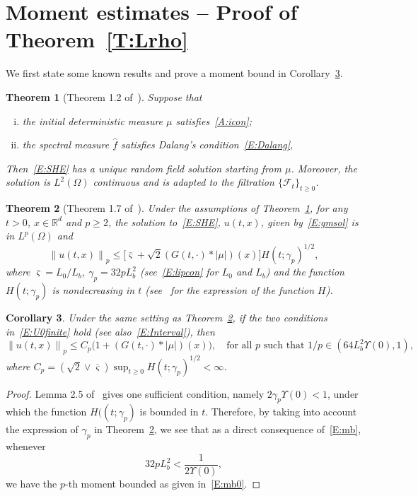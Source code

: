 \documentclass[a4paper,11pt]{article}%
\theoremstyle{plain}
\newtheorem{theorem}{Theorem}[section]
\newtheorem{corollary}[theorem]{Corollary}
\theoremstyle{definition}
\numberwithin{equation}{section}
\newcommand{\R}{\mathbb{R}}
\newcommand{\Norm}[1]{\left\| #1 \right\|}
\begin{document}
\section{Moment estimates -- Proof of Theorem~\ref{T:Lrho}}\label{S:Lrho}
We first state some known results and prove a moment bound in Corollary~\ref{C:Mom}.

\begin{theorem}[Theorem 1.2 of~\cite{chen.huang:19:comparison}]\label{T:Solve}
  Suppose that
  \begin{enumerate}[(i)]
   \item the initial deterministic measure $\mu$ satisfies~\eqref{A:icon};
   \item the spectral measure $\widehat{f}$ satisfies \textit{Dalang's condition}~\eqref{E:Dalang},
  \end{enumerate}
  Then~\eqref{E:SHE} has a unique random field solution starting from $\mu$. Moreover, the solution
  is $L^2 (\Omega)$ continuous and is adapted to the filtration $\{\mathcal{F}_t\}_{t\ge 0}$.
\end{theorem}

\begin{theorem}[Theorem 1.7 of~\cite{chen.huang:19:comparison}]\label{T:ExUn}
  Under the assumptions of Theorem~\ref{T:Solve}, for any $t>0$, $x \in \R^d$ and $p \ge 2$, the
  solution to~\eqref{E:SHE}, $u(t,x)$, given by~\eqref{E:gmsol} is in $L^p (\Omega)$ and
  \begin{equation}\label{E:mb}
    \Norm{u(t,x)}_p \le \big[\bar{\varsigma}+\sqrt{2}(G(t,\cdot) * |\mu|)(x)\big]H(t;\gamma_p)^{1/2},
  \end{equation}
  where $\bar{\varsigma} = L_0/L_b$, $\gamma_p = 32pL_b^2$ (see~\eqref{E:lipcon} for $L_0$ and $L_b$)
  and the function $H(t;\gamma_p)$ is nondecreasing in $t$ (see~\cite{chen.huang:19:comparison} for
  the expression of the function $H$).
\end{theorem}

\begin{corollary}\label{C:Mom}
  Under the same setting as Theorem~\ref{T:ExUn}, if the two conditions in~\eqref{E:U0finite} hold
  (see also~\eqref{E:Interval}), then
  \begin{equation}\label{E:mb0}
    \Norm{u(t,x)}_p \le C_p\bigg(1+ (G(t, \cdot)*|\mu|)(x) \bigg),
    \quad \text{for all $p$ such that $1/p \in \left(64 L_b^2\Upsilon(0),1\right)$},
  \end{equation}
  where $C_p = \left(\sqrt{2}\vee \overline{\varsigma}\right)\sup_{t\ge 0}
  H(t;\gamma_p)^{1/2}<\infty$.
\end{corollary}
\begin{proof}
  Lemma 2.5 of~\cite{chen.kim:19:nonlinear} gives one sufficient condition, namely
  $2\gamma_p\Upsilon(0)<1$, under which the function $H((t;\gamma_p)$ is bounded in $t$. Therefore,
  by taking into account the expression of $\gamma_p$ in Theorem~\ref{T:ExUn}, we see that as a
  direct consequence of~\eqref{E:mb}, whenever
  \begin{equation}\label{E:pLip}
     32 p L_b^2 < \frac{1}{2\Upsilon(0)},
  \end{equation}
  we have the $p$-th moment bounded as given in~\eqref{E:mb0}.
\end{proof}
\end{document}
